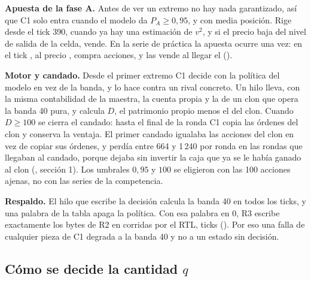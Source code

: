 \textbf{Apuesta de la fase A.} Antes de ver un extremo no hay nada garantizado, así que C1 solo entra cuando el modelo da $P_A \ge 0{,}95$, y con media posición. Rige desde el tick 390, cuando ya hay una estimación de $v^2$, y si el precio baja del nivel de salida de la celda, vende. En la serie de práctica la apuesta ocurre una vez: en el tick \ctresApuestaTick, al precio \ctresApuestaPrecio, compra \ctresApuestaAcciones{} acciones, y las vende al llegar el \cifraPrecioMax{} ().

\textbf{Motor y candado.} Desde el primer extremo C1 decide con la política del modelo en vez de la banda, y lo hace contra un rival concreto. Un hilo lleva, con la misma contabilidad de la maestra, la cuenta propia y la de un clon que opera la banda 40 pura, y calcula $D$, el patrimonio propio menos el del clon. Cuando $D \ge 100$ se cierra el candado: hasta el final de la ronda C1 copia las órdenes del clon y conserva la ventaja. El primer candado igualaba las acciones del clon en vez de copiar sus órdenes, y perdía entre 664 y 1\,240 por ronda en las rondas que llegaban al candado, porque dejaba sin invertir la caja que ya se le había ganado al clon (, sección 1). Los umbrales $0{,}95$ y $100$ se eligieron con las 100 acciones ajenas, no con las series de la competencia.

\textbf{Respaldo.} El hilo que escribe la decisión calcula la banda 40 en todos los ticks, y una palabra de la tabla apaga la política. Con esa palabra en 0, R3 escribe exactamente los bytes de R2 en \ctresApagadaCorridas{} corridas por el RTL, \ctresApagadaTicks{} ticks (). Por eso una falla de cualquier pieza de C1 degrada a la banda 40 y no a un estado sin decisión.

\subsection{Cómo se decide la cantidad $q$}

